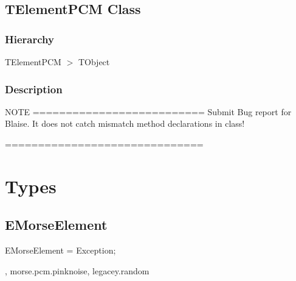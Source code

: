 \documentclass{report}
\newif\ifpdf
\begin{document}
\subsection*{TElementPCM Class}
\fi
\label{morse.pcm.Util.TElementPCM}
\subsubsection*{\large{\textbf{Hierarchy}}\normalsize\hspace{1ex}\hfill}
TElementPCM {$>$} TObject
\subsubsection*{\large{\textbf{Description}}\normalsize\hspace{1ex}\hfill}
NOTE ========================== Submit Bug report for Blaise. It does not catch mismatch method declarations in class!

==============================\section{Types}
\ifpdf
\subsection*{\large{\textbf{EMorseElement}}\normalsize\hspace{1ex}\hrulefill}
\else
\subsection*{EMorseElement}
\fi
\label{morse.pcm.Util-EMorseElement}
\begin{list}{}{
\setlength{\itemindent}{0cm}
\setlength{\listparindent}{0cm}
\setlength{\leftmargin}{\evensidemargin}
\addtolength{\leftmargin}{\tmplength}
\settowidth{\labelsep}{X}
\addtolength{\leftmargin}{\labelsep}
\setlength{\labelwidth}{\tmplength}
}
\item[\textbf{Declaration}\hfill]
\ifpdf
\begin{flushleft}
\fi
\begin{ttfamily}
EMorseElement = Exception;\end{ttfamily}

\ifpdf
\end{flushleft}
\fi

\par
\item[\textbf{Description}]
, morse.pcm.pinknoise, legacey.random

\end{list}
\ifpdf
\end{document}
